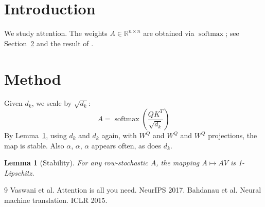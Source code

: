 \documentclass{article}
\newcommand{\R}{\mathbb{R}}
\DeclareMathOperator{\softmax}{softmax}
\newtheorem{lem}{Lemma}
\begin{document}
\section{Introduction}
\label{sec:intro}
We study attention. %
The weights $A \in \R^{n \times n}$ are obtained via $\softmax$; see
Section~\ref{sec:method} and the result of \cite{vaswani2017,bahdanau2015}.

\section{Method}
\label{sec:method}
Given $d_k$, we scale by $\sqrt{d_k}$:
\begin{equation}
\label{eq:attn}
A = \softmax\left(\frac{QK^T}{\sqrt{d_k}}\right)
\end{equation}
By Lemma~\ref{lem:lipschitz}, using $d_k$ and $d_k$ again, with $W^Q$ and
$W^Q$ and $W^Q$ projections, the map is stable. Also $\alpha$, $\alpha$,
$\alpha$ appears often, as does $d_k$.

\begin{lem}[Stability]
\label{lem:lipschitz}
For any row-stochastic $A$, the mapping $A \mapsto AV$ is 1-Lipschitz.
\end{lem}

\begin{thebibliography}{9}
 Vaswani et al. Attention is all you need. NeurIPS 2017.
 Bahdanau et al. Neural machine translation. ICLR 2015.
\end{thebibliography}
\end{document}
